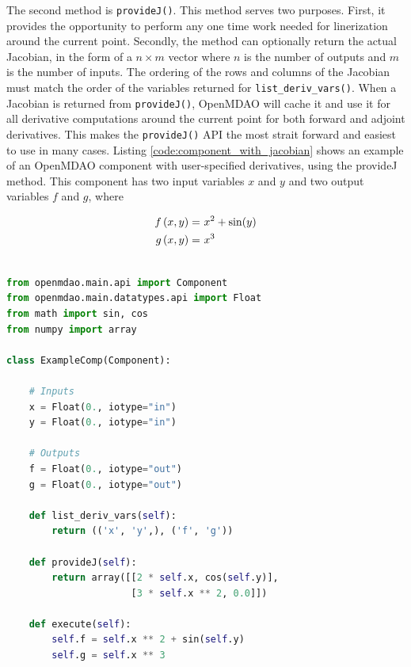 \documentclass[]{aiaa-tc} %
\begin{document}
        The second method is \texttt{provideJ()}. This method serves two purposes. First, it provides the 
        opportunity to perform any one time work needed for linerization around the current point. Secondly, 
        the method can optionally return the actual Jacobian, in the form of a $n \times m$ vector where $n$ is the 
        number of outputs and $m$ is the number of inputs. The ordering of the rows and columns of the Jacobian 
        must match the order of the variables returned for \texttt{list\_deriv\_vars()}. When a Jacobian is
        returned from \texttt{provideJ()}, OpenMDAO will cache it and use it for all derivative computations 
        around the current point for both forward and adjoint derivatives. This makes the \texttt{provideJ()}
        API the most strait forward and easiest to use in many cases. Listing \ref{code:component_with_jacobian} shows 
        an example of an OpenMDAO component with user-specified derivatives, using the provideJ method. 
        This component has two input variables $x$ and $y$ and two output variables $f$ and $g$, where

        \begin{align}
            f\left(x, y\right) =&\  x^2 + \sin(y) \\ \notag
            g\left(x, y\right) =&\  x^3
        \end{align}

\begin{minipage}{\linewidth}
\begin{lstlisting}[label=code:component_with_jacobian,caption=Example OpenMDAO
component with user-specified Jacobian,
language=Python, basicstyle=\ttfamily\scriptsize,
           keywordstyle=\color{blue}\ttfamily,
           stringstyle=\color{red}\ttfamily, showstringspaces=false,
           commentstyle=\color{olive}\ttfamily]

from openmdao.main.api import Component
from openmdao.main.datatypes.api import Float
from math import sin, cos
from numpy import array

class ExampleComp(Component):

    # Inputs
    x = Float(0., iotype="in")
    y = Float(0., iotype="in")

    # Outputs
    f = Float(0., iotype="out")
    g = Float(0., iotype="out")

    def list_deriv_vars(self):
        return (('x', 'y',), ('f', 'g'))

    def provideJ(self):
        return array([[2 * self.x, cos(self.y)],
                      [3 * self.x ** 2, 0.0]])

    def execute(self):
        self.f = self.x ** 2 + sin(self.y)
        self.g = self.x ** 3

\end{lstlisting}
\end{minipage}
\end{document}
